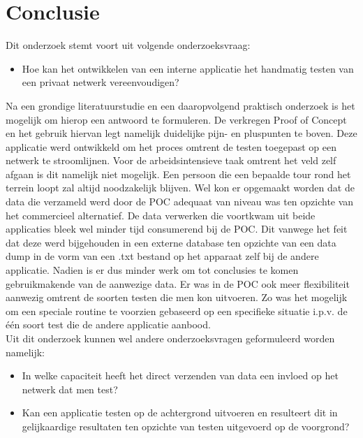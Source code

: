 
\chapter{Conclusie}%
\label{ch:conclusie}


Dit onderzoek stemt voort uit volgende onderzoeksvraag:
\begin{itemize}
    \item Hoe kan het ontwikkelen van een interne applicatie het handmatig testen van een privaat netwerk vereenvoudigen?
\end{itemize}

Na een grondige literatuurstudie en een daaropvolgend praktisch onderzoek is het mogelijk om hierop een antwoord te formuleren. De verkregen Proof of Concept en het gebruik hiervan legt namelijk duidelijke pijn- en pluspunten te boven. Deze applicatie werd ontwikkeld om het proces omtrent de testen toegepast op een netwerk te stroomlijnen. Voor de arbeidsintensieve taak omtrent het veld zelf afgaan is dit namelijk niet mogelijk. Een persoon die  een bepaalde tour rond het terrein loopt zal altijd noodzakelijk blijven. Wel kon er opgemaakt worden dat de data die verzameld werd door de POC adequaat van niveau was ten opzichte van het commercieel alternatief. De data verwerken die voortkwam uit beide applicaties bleek wel minder tijd consumerend bij de POC. Dit vanwege het feit dat deze werd bijgehouden in een externe database ten opzichte van een data dump in de vorm van een .txt bestand op het apparaat zelf bij de andere applicatie. Nadien is er dus minder werk om tot conclusies te komen gebruikmakende van de aanwezige data. Er was in de POC ook meer flexibiliteit aanwezig omtrent de soorten testen die men kon uitvoeren. Zo was het mogelijk om een speciale routine te voorzien gebaseerd op een specifieke situatie i.p.v. de één soort test die de andere applicatie aanbood.\\

Uit dit onderzoek kunnen wel andere onderzoeksvragen geformuleerd worden namelijk:
\begin{itemize}
    \item In welke capaciteit heeft het direct verzenden van data een invloed op het netwerk dat men test?
    \item Kan een applicatie testen op de achtergrond uitvoeren en resulteert dit in gelijkaardige resultaten ten opzichte van testen uitgevoerd op de voorgrond?
\end{itemize}


